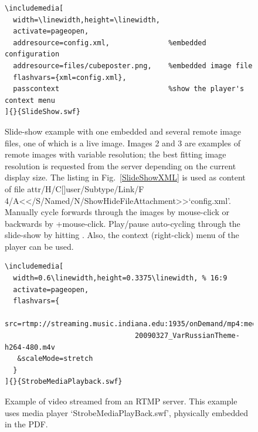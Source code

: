 \documentclass[a4paper]{article}
\begin{document}
\begin{figure}[bp]
\makeatletter%
\begingroup%
\def\HyColor@UseColor#1{\color{#1}}%
\def\Acrobatmenu#1#2{\leavevmode\pdfstartlink attr{\Hy@setpdfborder\ifx\@pdfhighlight\@empty\else/H\@pdfhighlight\fi\ifx\@menubordercolor\relax\else/C[\@menubordercolor]\fi}user{/Subtype/Link\ifHy@pdfa/F 4\fi/A<</S/Named/N/#1>>}\relax\Hy@colorlink\@menucolor#2\close@pdflink}%
\makeatother%
\savebox{\keyshift}{\keys{\shift+}}%
%
\centering
\begin{Verbatim}
\includemedia[
  width=\linewidth,height=\linewidth,
  activate=pageopen,
  addresource=config.xml,              %embedded configuration
  addresource=files/cubeposter.png,    %embedded image file
  flashvars={xml=config.xml},
  passcontext                          %show the player's context menu
]{}{SlideShow.swf}
\end{Verbatim}
\vspace{1ex}
\caption{Slide-show example with one embedded and several remote image files, one of which is a live image. Images 2 and 3 are examples of remote images with variable resolution; the best fitting image resolution is requested from the server depending on the current display size. The listing in Fig.~\ref{SlideShowXML} is used as content of file \Acrobatmenu{ShowHideFileAttachment}{`config.xml'}. Manually cycle forwards through the images by mouse-click or backwards by \usebox{\keyshift}+mouse-click. Play/pause auto-cycling through the slide-show by hitting \usebox{\spacebar}. Also, the context (right-click) menu of the player can be used.}\label{slideshowex}
\endgroup
\end{figure}

\begin{figure}[bp]
\centering
\begin{Verbatim}
\includemedia[
  width=0.6\linewidth,height=0.3375\linewidth, % 16:9
  activate=pageopen,
  flashvars={
    src=rtmp://streaming.music.indiana.edu:1935/onDemand/mp4:media/%
                               20090327_VarRussianTheme-h264-480.m4v
   &scaleMode=stretch
  }
]{}{StrobeMediaPlayback.swf}
\end{Verbatim}
\vspace{1ex}
\caption{Example of video streamed from an RTMP server. This example uses media player `StrobeMediaPlayBack.swf', physically embedded in the PDF.}\label{videob}
\end{figure}
\end{document}
